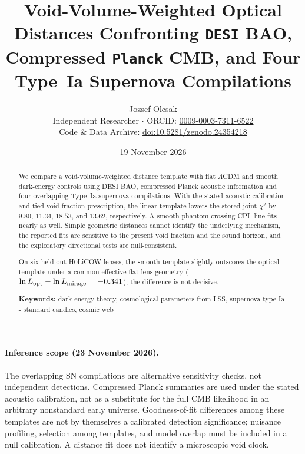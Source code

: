\documentclass[11pt,a4paper]{article}
\title{Void-Volume-Weighted Optical Distances Confronting \texttt{DESI} BAO, Compressed \texttt{Planck} CMB, and Four Type~Ia Supernova Compilations}
\author{Jozsef Olcsak\\[0.25em]
\small Independent Researcher $\cdot$ ORCID: \href{https://orcid.org/0009-0003-7311-6522}{0009-0003-7311-6522}\\
\small Code \& Data Archive: \href{https://doi.org/10.5281/zenodo.24354218}{doi:10.5281/zenodo.24354218}}
\date{19 November 2026}
\begin{document}
\maketitle

\begin{abstract}
\noindent We compare a void-volume-weighted distance template with flat $\Lambda$CDM and smooth dark-energy controls using DESI BAO, compressed Planck acoustic information and four overlapping Type~Ia supernova compilations. With the stated acoustic calibration and tied void-fraction prescription, the linear template lowers the stored joint $\chi^2$ by $9.80$, $11.34$, $18.53$, and $13.62$, respectively. A smooth phantom-crossing CPL line fits nearly as well. Simple geometric distances cannot identify the underlying mechanism, the reported fits are sensitive to the present void fraction and the sound horizon, and the exploratory directional tests are null-consistent.

On six held-out H0LiCOW lenses, the smooth template slightly outscores the optical template under a common effective flat lens geometry ($\ln L_{\rm opt}-\ln L_{\rm mirage}=-0.341$); the difference is not decisive.

\smallskip\noindent\textbf{Keywords:} dark energy theory, cosmological parameters from LSS, supernova type Ia - standard candles, cosmic web
\end{abstract}

\paragraph{Inference scope (23 November 2026).}
The overlapping SN compilations are alternative sensitivity checks, not
independent detections. Compressed Planck summaries are used under the
stated acoustic calibration, not as a substitute for the full CMB
likelihood in an arbitrary nonstandard early universe.
Goodness-of-fit differences among these templates are not by themselves
a calibrated detection significance; nuisance profiling, selection among
templates, and model overlap must be included in a null calibration.
A distance fit does not identify a microscopic void clock.
\end{document}
